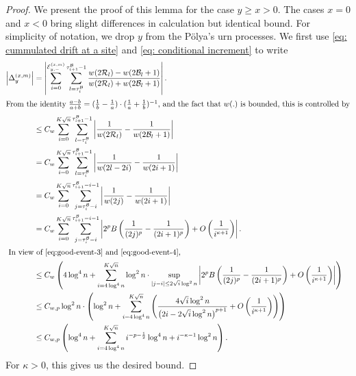 \documentclass[EJP]{ejpecp} %
\begin{document}
\begin{proof}%
	We present the proof of this lemma for the case $y \ge  x > 0$. The cases $x = 0$ and $x<0$ bring slight differences in calculation but identical bound. For simplicity of notation, we drop $y$ from the P\"olya's urn processes. We first use \eqref{eq: cummulated drift at a site} and \eqref{eq: conditional increment} to write 
	\begin{align*}
		\left| \Delta_y^{(x,m)} \right| 
		&= 
		\left| 	\sum_{i = 0}^{\mathcal{E}_{y,-}^{(x,m)}} 
		\sum_{l = \tau_i^{\mathcal{B}}} ^{\tau_{i+1}^{\mathcal{B}}  -1}
		\frac{w(2 \mathcal{R}_l)- w(2 \mathcal{B}_l + 1)}{w(2 \mathcal{R}_l)+ w(2 \mathcal{B}_l + 1)}
		\right| .\\
		\intertext{From the identity $\frac{a - b}{a + b} = (\frac{1}{b} - \frac{1}{a})\cdot(\frac{1}{a} + \frac{1}{b})^{-1}$, and the fact that $w(.)$ is bounded, this is controlled by}
		&\le C_w \sum_{i = 0}^{K \sqrt{n} } \sum_{l = \tau_i^{\mathcal{B}}} ^{\tau_{i+1}^{\mathcal{B}}  -1}
		\left| \frac{1}{w(2 \mathcal{R}_l)} - \frac{1}{w(2 \mathcal{B}_l + 1)} \right|  \\
		&= C_w \sum_{i = 0}^{K \sqrt{n} } \sum_{l = \tau_i^{\mathcal{B}}} ^{\tau_{i+1}^{\mathcal{B}}  -1}
		\left| \frac{1}{w(2 l - 2 i)} - \frac{1}{w(2i + 1)} \right|  \\
		&= C_w \sum_{i = 0}^{K \sqrt{n} }
		\sum_{j = \tau_i^{\mathcal{B}} - i}^{\tau_{i+1}^{\mathcal{B}} - i - 1} \left| \frac{1}{w(2j)} - \frac{1}{w(2i + 1)} \right|  \\
		&= C_w \sum_{i = 0}^{K \sqrt{n} }
		\sum_{j = \tau_i^{\mathcal{B}} - i}^{\tau_{i+1}^{\mathcal{B}} - i - 1} \left|  2^p B\left( \frac{1}{(2j)^p} - \frac{1}{(2i + 1)^p} \right)  + O\left( \frac{1}{i^{\kappa + 1}} \right) \right|  .\\
		\intertext{
			In view of \eqref{eq:good-event-3} and \eqref{eq:good-event-4},
		}
		&\le C_w \left(4 \log^4 n + \sum_{i = 4 \log^4 n}^{K \sqrt{n} } \log^2 n \cdot \sup_{|j - i| \le 2 \sqrt{i}  \log^2 n} \left|  2^p B\left( \frac{1}{(2j)^p} - \frac{1}{(2i + 1)^p} \right)  + O\left( \frac{1}{i^{\kappa + 1}} \right) \right|\right)\\
		&\le C_{w, p} \log^2 n \cdot \left( \log^2 n + \sum_{i = 4 \log^4 n}^{K \sqrt{n} } \left( 
		\frac{4 \sqrt{ i } \log^2 n }{\left(2 i - 2 \sqrt{ i } \log^2 n\right)^{p + 1}} 
		+ O\left( \frac{1}{i^{\kappa + 1}} \right)
		\right) \right)  \\
		&\le C_{w, p} \left(\log^4 n + \sum_{i = 4 \log^4 n}^{K \sqrt{n} } i^{- p - \frac{1}{2}} \log^4 n + i^{- \kappa - 1 } \log^2 n \right)
		.\end{align*} 
	For $\kappa>0$, this gives us the desired bound.
\end{proof}
\end{document}
